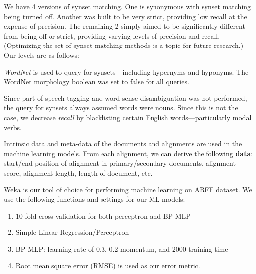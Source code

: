 We have 4 versions of synset matching. One is synonymous with synset matching being turned off. Another was built to be very strict, providing low recall at the expense of precision. The remaining 2 simply aimed to be significantly different from being off or strict, providing varying levels of precision and recall. (Optimizing the set of synset matching methods is a topic for future research.) Our levels are as follows:

\textit{WordNet} \cite{wordnet_1998} is used to query for synsets---including hypernyms and hyponyms. The WordNet morphology boolean was set to false for all queries. 

Since part of speech tagging and word-sense disambiguation was not performed, the query for synsets always assumed words were nouns. Since this is not the case, we decrease \textit{recall} by blacklisting certain English words---particularly modal verbs. %

Intrinsic data and meta-data of the documents and alignments are used in the machine learning models. From each alignment, we can derive the following \textbf{data}: start/end position of alignment in primary/secondary documents, alignment score, alignment length, length of document, etc.

Weka \cite{weka_2009} is our tool of choice for performing machine learning on ARFF dataset. We use the following functions and settings for our ML models:
\begin{enumerate}
	\item 10-fold cross validation for both perceptron and BP-MLP
	\item Simple Linear Regression/Perceptron
	\item BP-MLP: learning rate of 0.3, 0.2 momentum, and 2000 training time
	\item Root mean square error (RMSE) is used as our error metric.
\end{enumerate}

